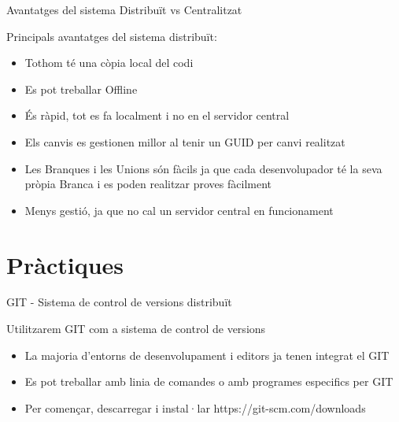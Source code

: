 \documentclass[10pt,xcolor={rgb}]{beamer}
\begin{document}
    \begin{frame}[fragile]{Avantatges del sistema Distribuït vs Centralitzat}
      
            \begin{block}{Principals avantatges del sistema distribuït:}
      
              \begin{itemize}
                \item Tothom té una còpia local del codi
                \item Es pot treballar Offline
                \item És ràpid, tot es fa localment i no en el servidor central
                \item Els canvis es gestionen millor al tenir un GUID per canvi realitzat
                \item Les Branques i les Unions són fàcils ja que cada desenvolupador té la seva pròpia Branca i es poden realitzar proves fàcilment
                \item Menys gestió, ja que no cal un servidor central en funcionament
              \end{itemize}
      
            \end{block}
      
    \end{frame}

    \section{Pràctiques}
    
    \begin{frame}[fragile]{GIT - Sistema de control de versions distribuït}
            \begin{block}{Utilitzarem GIT com a sistema de control de versions}
      
              \begin{itemize}
                \item La majoria d'entorns de desenvolupament i editors ja tenen integrat el GIT
                \item Es pot treballar amb linia de comandes o amb programes especifics per GIT
                \item Per començar, descarregar i instal·lar https://git-scm.com/downloads
              \end{itemize}
      
            \end{block}
    \end{frame}
\end{document}
